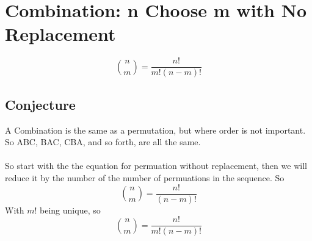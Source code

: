 \section{ Combination: n Choose m with No Replacement}
\[{n \choose m} = \frac{n!}{m!(n-m)!}\]

\subsection{Conjecture}
A Combination is the same as a permutation, but where order is not important.  So ABC, BAC, CBA, and so forth, are all the same.\\
\\
So start with the the equation for permuation without replacement, then we will reduce it by the number of the number of permuations in the sequence. So\\
\[{n \choose m} = \frac{n!}{(n-m)!}\]
With \(m!\) being unique, so\\
\[{n \choose m} = \frac{n!}{m!(n-m)!}\]
